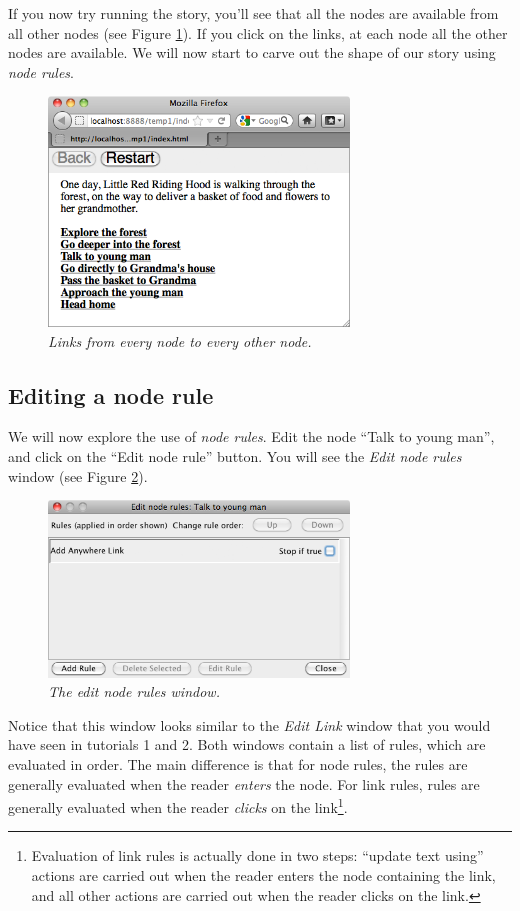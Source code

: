 \documentclass{article}
\begin{document}
If you now try running the story, you'll see that all the nodes are available
from all other nodes (see Figure \ref{fig:tut3:running_start}). If you click on
the links, at each node all the other nodes are available. We will now start to
carve out the shape of our story using \textit{node rules}.

\begin{figure}[h]
  \centering
  \includegraphics[width=8cm]{images/hypedyn-tutorial-3-figure-3}
  \caption{\textit{Links from every node to every other node.}}
  \label{fig:tut3:running_start}
\end{figure} 

\subsection{Editing a node rule}

We will now explore the use of \textit{node rules}. Edit the node ``Talk to young
man'', and click on the ``Edit node rule'' button. You will see the \textit{Edit
node rules} window (see Figure \ref{fig:tut3:edit_node_rules}).

\begin{figure}[h]
  \centering
  \includegraphics[width=8cm]{images/hypedyn-tutorial-3-figure-4}
  \caption{\textit{The edit node rules window.}}
  \label{fig:tut3:edit_node_rules}
\end{figure} 

Notice that this window looks similar to the \textit{Edit Link} window that you
would have seen in tutorials 1 and 2. Both windows contain a list of rules, which
are evaluated in order. The main difference is that for node rules, the rules are
generally evaluated when the reader \textit{enters} the node. For link rules,
rules are generally evaluated when the reader \textit{clicks} on the
link\footnote{Evaluation of link rules is actually done in two steps: ``update
text using'' actions are carried out when the reader enters the node containing
the link, and all other actions are carried out when the reader clicks on the
link.}.
\end{document}
